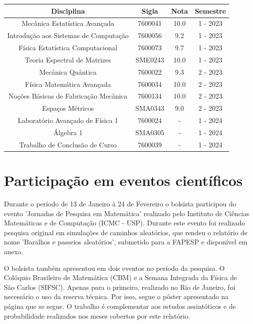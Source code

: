 \documentclass[12pt]{report}
\begin{document}
\begin{center}
	\begin{tabular}{|c|c|c|c|}
		\hline
		Disciplina & Sigla & Nota & Semestre \\
		\hline
		Mecânica Estatística Avançada & 7600041 & 10.0 & 1 - 2023 \\
		\hline
		Introdução aos Sistemas de Computação & 7600056 & 9.2 & 1 - 2023 \\
		\hline
		Física Estatística Computacional & 7600073 & 9.7 & 1 - 2023 \\
		\hline
		Teoria Espectral de Matrizes & SME0243 & 10.0 & 1 - 2023 \\
		\hline
		Mecânica Quântica & 7600022 & 9.3 & 2 - 2023 \\
		\hline
		Física Matemática Avançada & 7600034 & 10.0 & 2 - 2023 \\
		\hline
		Noções Básicas de Fabricação Mecânica & 7600134 & 10.0 & 2 - 2023 \\
		\hline
		Espaços Métricos & SMA0343 & 9.0 & 2 - 2023 \\
		\hline
		Laboratório Avançado de Física 1& 7600024 & - & 1 - 2024 \\
		\hline
		Álgebra 1 & SMA0305 & - & 1 - 2024 \\
		\hline
		Trabalho de Conclusão de Curso & 7600039 & - & 1 - 2024 \\
		\hline
	\end{tabular}
\end{center}

\section{Participação em eventos científicos}\label{chp:particEvento}

Durante o período de 13 de Janeiro à 24 de Fevereiro o bolsista participou do evento 'Jornadas de Pesquisa em Matemática' realizado pelo Instituto de Ciências Matemáticas e de Computação (ICMC - USP). Durante este evento foi realizado pesquisa original em simulações de caminhos aleatórios, que rendeu o relatório de nome 'Baralhos e passeios aleatórios', submetido para a FAPESP e disponível em anexo.

O bolsista também apresentou em dois eventos no período da pesquisa. O Colóquio Brasileiro de Matemática (CBM) e a Semana Integrada da Física de São Carlos (SIFSC). Apenas para o primeiro, realizado no Rio de Janeiro, foi necessário o uso da reserva técnica. Por isso, segue o pôster apresentado na página que se segue. O trabalho é complementar aos estudos assintóticos e de probabilidade realizados nos meses cobertos por este relatório.
\end{document}
